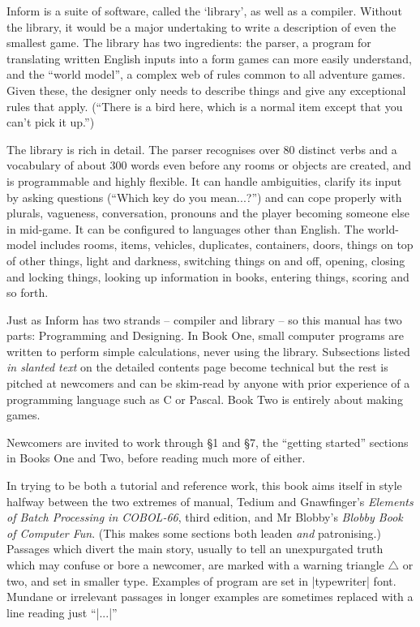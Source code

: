 Inform is a suite of software, called the `library', as well as a compiler.
Without the library, it would be a major undertaking to write a description
of even the smallest game.  The library has two ingredients: the parser, a
program for translating written English inputs into a form games can more
easily understand, and the ``world model'', a complex web of rules common
to all adventure games.  Given these, the designer only needs to describe
things and give any exceptional rules that apply.  (``There is a bird here,
which is a normal item except that you can't pick it up.'')

The library is rich in detail.  The parser recognises over 80 distinct verbs
and a vocabulary of about 300 words even before any rooms or objects are
created, and is programmable and highly flexible.  It can handle ambiguities,
clarify its input by asking questions (``Which key do you mean...?'') and can
cope properly with plurals, vagueness, conversation, pronouns and the player
becoming someone else in mid-game.  It can be configured to languages other
than English.  The world-model includes rooms, items, vehicles, duplicates,
containers, doors, things on top of other things, light and darkness,
switching things on and off, opening, closing and locking things, looking
up information in books, entering things, scoring and so forth.

\bigskip

Just as Inform has two strands -- compiler and library -- so this manual has
two parts: Programming and Designing.  In Book One, small computer programs
are written to perform simple calculations, never using the library.  Subsections
listed {\sl in slanted text} on the detailed contents page become technical
but the rest is pitched at newcomers and can be skim-read by anyone with
prior experience of a programming language such as C or Pascal.  Book Two
is entirely about making games.

Newcomers are invited to work through \S 1 and \S 7, the ``getting started''
sections in Books One and Two, before reading much more of either.

\bigskip
In trying to be both a tutorial and reference work, this book aims itself
in style halfway between the two extremes of manual, Tedium and Gnawfinger's
{\sl Elements of Batch Processing in COBOL-66}, third edition, and Mr Blobby's
{\sl Blobby Book of Computer Fun}.  (This makes some sections both leaden
{\sl and} patronising.)  Passages which divert the main story, usually to
tell an unexpurgated truth which may confuse or bore a newcomer, are marked
with a warning triangle $\triangle$ or two, and set in smaller type.  Examples
of program are set in |typewriter| font.  Mundane or irrelevant passages in
longer examples are sometimes replaced with a line reading just ``|...|''

